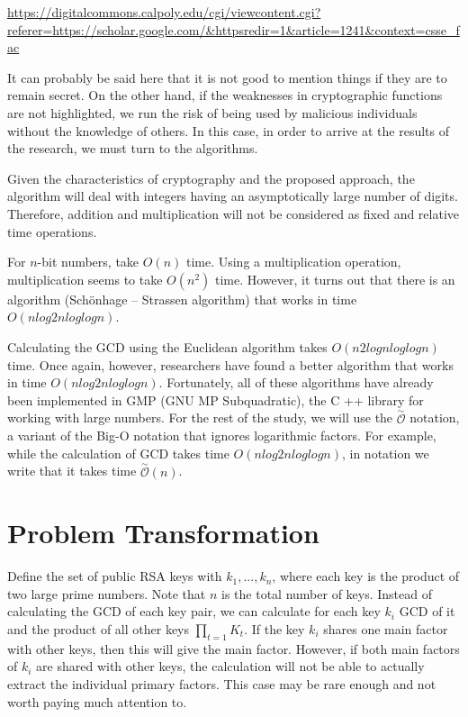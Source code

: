 \documentclass[runningheads]{llncs}
\begin{document}
\url{https://digitalcommons.calpoly.edu/cgi/viewcontent.cgi?referer=https://scholar.google.com/&httpsredir=1&article=1241&context=csse_fac}

It can probably be said here that it is not good to mention things if they are to remain secret. On the other hand, if the weaknesses in cryptographic functions are not highlighted, we run the risk of being used by malicious individuals without the knowledge of others. In this case, in order to arrive at the results of the research, we must turn to the algorithms. 

Given the characteristics of cryptography and the proposed approach, the algorithm will deal with integers having an asymptotically large number of digits. Therefore, addition and multiplication will not be considered as fixed and relative time operations.

For $n$-bit numbers, take $O(n)$ time. Using a multiplication operation, multiplication seems to take $O(n^2)$ time. However, it turns out that there is an algorithm (Schönhage – Strassen algorithm) that works in time $O(n log 2 n log log n)$.

Calculating the GCD using the Euclidean algorithm takes $O(n2 log n log log n)$ time. Once again, however, researchers have found a better algorithm that works in time $O (n log 2 n log log n)$. Fortunately, all of these algorithms have already been implemented in GMP (GNU MP Subquadratic), the C ++ library for working with large numbers. For the rest of the study, we will use the $\overset{\sim}{\mathcal{O}}$ notation, a variant of the Big-O notation that ignores logarithmic factors. For example, while the calculation of GCD takes time $O (n log 2 n log log n)$, in notation we write that it takes time $\overset{\sim}{\mathcal{O}}(n)$.

\section{Problem Transformation}
\label{sec:4}

Define the set of public RSA keys with $k_1, ... , k_n$, where each key is the product of two large prime numbers. Note that $n$ is the total number of keys. Instead of calculating the GCD of each key pair, we can calculate for each key $k_i$ GCD of it and the product of all other keys $\prod_{t=1} K_t$. If the key $k_i$ shares one main factor with other keys, then this will give the main factor. However, if both main factors of $k_i$ are shared with other keys, the calculation will not be able to actually extract the individual primary factors. This case may be rare enough and not worth paying much attention to. 
\end{document}
